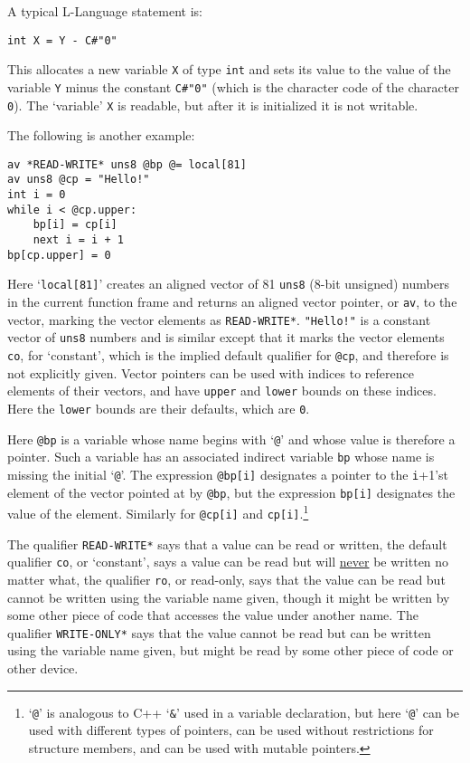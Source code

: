 \documentclass[12pt]{article}
\newenvironment{indpar}[1][0.3in]%
	{\begin{list}{}%
		     {\setlength{\itemsep}{0in}%
		      \setlength{\topsep}{0in}%
		      \setlength{\parsep}{1ex}%
		      \setlength{\labelwidth}{#1}%
		      \setlength{\leftmargin}{#1}%
		      \addtolength{\leftmargin}{\labelsep}}%
	 \item}%
	{\end{list}}
\begin{document}
A typical L-Language statement is:
\begin{indpar}\begin{verbatim}
int X = Y - C#"0"
\end{verbatim}\end{indpar}
This allocates a new variable {\tt X} of type {\tt int}
and sets its value to the value of the
variable {\tt Y} minus the constant {\tt C\#"0"} (which is
the character code of the character {\tt 0}).
The `variable' {\tt X} is readable, but after it is
initialized it is not writable.

The following is another example:
\begin{indpar}\begin{verbatim}
av *READ-WRITE* uns8 @bp @= local[81]
av uns8 @cp = "Hello!"
int i = 0
while i < @cp.upper:
    bp[i] = cp[i]
    next i = i + 1
bp[cp.upper] = 0
\end{verbatim}\end{indpar}

Here `{\tt local[81]}' creates an aligned vector of
81 {\tt uns8} (8-bit unsigned) numbers in the current function
frame and returns an aligned vector pointer, or {\tt av}, to
the vector, marking the vector elements as {\tt *READ-WRITE*}.
{\tt "Hello!"} is a constant vector of {\tt uns8} numbers
and is similar except that it marks the vector elements
{\tt co}, for `constant', which is the implied default qualifier
for {\tt @cp}, and therefore
is not explicitly given.
Vector pointers can be used with indices
to reference elements of their vectors, and have {\tt upper} and
{\tt lower} bounds on these indices.  Here the {\tt lower} bounds
are their defaults, which are {\tt 0}.

Here {\tt @bp} is a variable whose name begins with `{\tt @}' and
whose value is therefore a pointer.  Such a variable has an associated
indirect variable {\tt bp} whose name is missing the initial `{\tt @}'.
The expression {\tt @bp[i]} designates a pointer to the {\tt i}+1'st
element of the vector pointed at by {\tt @bp}, but the expression
{\tt bp[i]} designates the value of the element.  Similarly for
{\tt @cp[i]} and {\tt cp[i]}.\footnote{`{\tt @}' is analogous to
C++ `{\tt \&}' used in a variable declaration, but here `{\tt @}'
can be used with different types of pointers, can be used
without restrictions for structure members, and can be used
with mutable pointers.}

The qualifier {\tt *READ-WRITE*} says that a value can be read or written,
the default qualifier {\tt co}, or `constant',
says a value can be read but will \underline{never} be written no matter what,
the qualifier {\tt ro}, or read-only, says that
the value can be read but
cannot be written using the variable name given, though it might be
written by some other piece of code that accesses the value under another
name.  The qualifier {\tt *WRITE-ONLY*} says that the value cannot be
read but can be written using the variable name given,
but might be read by some other piece of code or other device.
\end{document}
